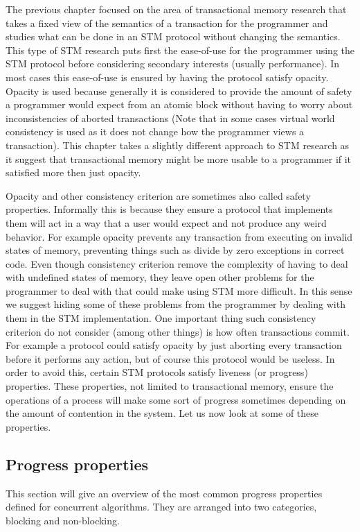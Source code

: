The previous chapter focused on the area of transactional
memory research that takes a fixed view of the semantics of a transaction for the programmer
and studies what can be done in an STM protocol without changing the semantics.
This type of STM research puts first the ease-of-use for the programmer using the STM protocol
before considering secondary interests (usually performance).
In most cases this ease-of-use is ensured by having the protocol satisfy opacity.
Opacity is used because generally it is considered
to provide the amount of safety a programmer would expect from an atomic block without having
to worry about inconsistencies of aborted transactions
(Note that in some cases virtual world consistency is used as it does not change
how the programmer views a transaction).
This chapter takes a slightly different approach to STM research as it suggest that transactional
memory might be more usable to a programmer if it satisfied more then just opacity.

Opacity and other consistency criterion are sometimes also called safety properties.
Informally this is because they ensure a protocol that implements them will
act in a way that a user would expect and not produce any weird behavior.
For example opacity prevents any transaction from executing on invalid states of memory, preventing
things such as divide by zero exceptions in correct code.
Even though consistency criterion remove the complexity of having to deal with undefined states of memory,
they leave open other problems for the programmer to deal with that could make using STM more difficult.
In this sense we suggest hiding some of these problems from the programmer by dealing with them in the STM
implementation.
One important thing such consistency criterion do not consider (among other things) is how often transactions commit.
For example a protocol could satisfy opacity by just aborting every transaction before it performs
any action, but of course this protocol would be useless.
In order to avoid this, certain STM protocols satisfy liveness (or progress) properties.
These properties, not limited to transactional memory, ensure the operations of a process
will make some sort of progress sometimes depending on the amount of contention in the system.
Let us now look at some of these properties.

\subsection{Progress properties}
This section will give an overview of the most common progress properties defined
for concurrent algorithms.
They are arranged into two categories, blocking and non-blocking.

